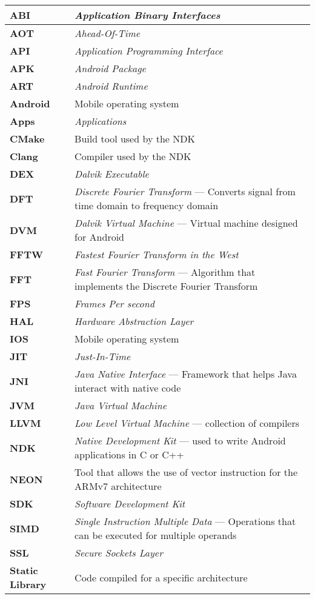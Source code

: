 \begin{tabular}{lp{12cm}}
\textbf{ABI} & \emph{Application Binary Interfaces}\\\hline
\textbf{AOT} & \emph{Ahead-Of-Time}\\\hline
\textbf{API} & \emph{Application Programming Interface}\\\hline
\textbf{APK} & \emph{Android Package}\\\hline
\textbf{ART} & \emph{Android Runtime}\\\hline
\textbf{Android} & Mobile operating system\\\hline
\textbf{Apps} & \emph{Applications}\\\hline
\textbf{CMake} & Build tool used by the NDK\\\hline
\textbf{Clang} & Compiler used by the NDK\\\hline
\textbf{DEX} & \emph{Dalvik Executable}\\\hline
\textbf{DFT} & \textit{Discrete Fourier Transform} --- Converts signal from time domain to frequency domain\\\hline
\textbf{DVM} & \textit{Dalvik Virtual Machine} --- Virtual machine designed for Android\\\hline
\textbf{FFTW} & \emph{Fastest Fourier Transform in the West}\\\hline
\textbf{FFT} & \textit{Fast Fourier Transform} --- Algorithm that implements the Discrete Fourier Transform\\\hline
\textbf{FPS} & \emph{Frames Per second}\\\hline
\textbf{HAL} & \emph{Hardware Abstraction Layer}\\\hline
\textbf{IOS} & Mobile operating system\\\hline
\textbf{JIT} & \emph{Just-In-Time}\\\hline
\textbf{JNI} & \textit{Java Native Interface} --- Framework that helps Java interact with native code\\\hline
\textbf{JVM} & \emph{Java Virtual Machine}\\\hline
\textbf{LLVM} & \emph{Low Level Virtual Machine} --- collection of compilers\\\hline
\textbf{NDK} & \textit{Native Development Kit} --- used to write Android applications in C or C++\\\hline
\textbf{NEON} & Tool that allows the use of vector instruction for the ARMv7 architecture\\\hline
\textbf{SDK} & \emph{Software Development Kit}\\\hline
\textbf{SIMD} & \textit{Single Instruction Multiple Data} --- Operations that can be executed for multiple operands\\\hline
\textbf{SSL} & \emph{Secure Sockets Layer}\\\hline
\textbf{Static Library} & Code compiled for a specific architecture\\\hline
\end{tabular}
